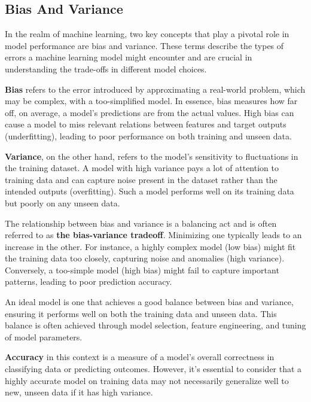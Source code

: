 \documentclass[letterpaper,10pt]{article}
\begin{document}
\subsection{Bias And Variance}
In the realm of machine learning, two key concepts that play a pivotal role in model performance are bias and variance. These terms describe the types of errors a machine learning model might encounter and are crucial in understanding the trade-offs in different model choices. \par

\textbf{Bias} refers to the error introduced by approximating a real-world problem, which may be complex, with a too-simplified model. In essence, bias measures how far off, on average, a model's predictions are from the actual values. High bias can cause a model to miss relevant relations between features and target outputs (underfitting), leading to poor performance on both training and unseen data. \par

\textbf{Variance}, on the other hand, refers to the model's sensitivity to fluctuations in the training dataset. A model with high variance pays a lot of attention to training data and can capture noise present in the dataset rather than the intended outputs (overfitting). Such a model performs well on its training data but poorly on any unseen data. \par

The relationship between bias and variance is a balancing act and is often referred to as \textbf{the bias-variance tradeoff}. Minimizing one typically leads to an increase in the other. For instance, a highly complex model (low bias) might fit the training data too closely, capturing noise and anomalies (high variance). Conversely, a too-simple model (high bias) might fail to capture important patterns, leading to poor prediction accuracy. \par

An ideal model is one that achieves a good balance between bias and variance, ensuring it performs well on both the training data and unseen data. This balance is often achieved through model selection, feature engineering, and tuning of model parameters. \par

\textbf{Accuracy} in this context is a measure of a model's overall correctness in classifying data or predicting outcomes. However, it's essential to consider that a highly accurate model on training data may not necessarily generalize well to new, unseen data if it has high variance. \par
\end{document}
